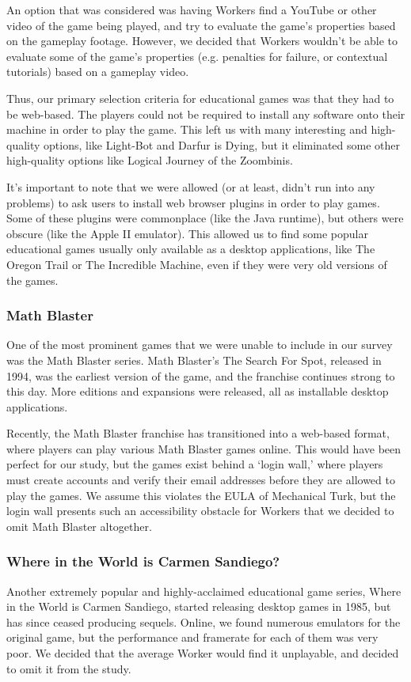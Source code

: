 \documentclass[12pt]{report}
\begin{document}
			An option that was considered was having Workers find a YouTube or other video of the game being played, and try to evaluate the game's properties based on the gameplay footage. However, we decided that Workers wouldn't be able to evaluate some of the game's properties (e.g. penalties for failure, or contextual tutorials) based on a gameplay video. 

			Thus, our primary selection criteria for educational games was that they had to be web-based. The players could not be required to install any software onto their machine in order to play the game. This left us with many interesting and high-quality options, like Light-Bot and Darfur is Dying, but it eliminated some other high-quality options like Logical Journey of the Zoombinis.

			It's important to note that we were allowed (or at least, didn't run into any problems) to ask users to install web browser plugins in order to play games. Some of these plugins were commonplace (like the Java runtime), but others were obscure (like the Apple II emulator). This allowed us to find some popular educational games usually only available as a desktop applications, like The Oregon Trail or The Incredible Machine, even if they were very old versions of the games.

		\subsubsection{Math Blaster}
			One of the most prominent games that we were unable to include in our survey was the Math Blaster series. Math Blaster's The Search For Spot, released in 1994, was the earliest version of the game, and the franchise continues strong to this day. More editions and expansions were released, all as installable desktop applications.

			Recently, the Math Blaster franchise has transitioned into a web-based format, where players can play various Math Blaster games online. This would have been perfect for our study, but the games exist behind a `login wall,' where players must create accounts and verify their email addresses before they are allowed to play the games. We assume this violates the EULA of Mechanical Turk, but the login wall presents such an accessibility obstacle for Workers that we decided to omit Math Blaster altogether. 

		\subsubsection{Where in the World is Carmen Sandiego?}
			Another extremely popular and highly-acclaimed educational game series, Where in the World is Carmen Sandiego, started releasing desktop games in 1985, but has since ceased producing sequels. Online, we found numerous emulators for the original game, but the performance and framerate for each of them was very poor. We decided that the average Worker would find it unplayable, and decided to omit it from the study.
\end{document}
